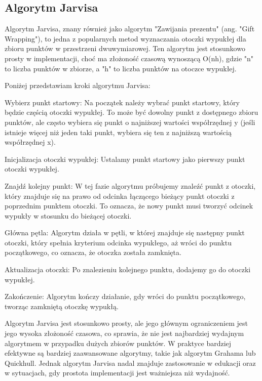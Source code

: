 \subsection{Algorytm Jarvisa}
Algorytm Jarvisa, znany również jako algorytm "Zawijania prezentu" (ang. "Gift Wrapping"), to jedna z popularnych metod wyznaczania otoczki wypukłej dla zbioru punktów w przestrzeni dwuwymiarowej. Ten algorytm jest stosunkowo prosty w implementacji, choć ma złożoność czasową wynoszącą O(nh), gdzie "n" to liczba punktów w zbiorze, a "h" to liczba punktów na otoczce wypukłej.

Poniżej przedstawiam kroki algorytmu Jarvisa:

Wybierz punkt startowy: Na początek należy wybrać punkt startowy, który będzie częścią otoczki wypukłej. To może być dowolny punkt z dostępnego zbioru punktów, ale często wybiera się punkt o najniższej wartości współrzędnej y (jeśli istnieje więcej niż jeden taki punkt, wybiera się ten z najniższą wartością współrzędnej x).

Inicjalizacja otoczki wypukłej: Ustalamy punkt startowy jako pierwszy punkt otoczki wypukłej.

Znajdź kolejny punkt: W tej fazie algorytmu próbujemy znaleźć punkt z otoczki, który znajduje się na prawo od odcinka łączącego bieżący punkt otoczki z poprzednim punktem otoczki. To oznacza, że nowy punkt musi tworzyć odcinek wypukły w stosunku do bieżącej otoczki.

Główna pętla: Algorytm działa w pętli, w której znajduje się następny punkt otoczki, który spełnia kryterium odcinka wypukłego, aż wróci do punktu początkowego, co oznacza, że otoczka została zamknięta.

Aktualizacja otoczki: Po znalezieniu kolejnego punktu, dodajemy go do otoczki wypukłej.

Zakończenie: Algorytm kończy działanie, gdy wróci do punktu początkowego, tworząc zamkniętą otoczkę wypukłą.

Algorytm Jarvisa jest stosunkowo prosty, ale jego głównym ograniczeniem jest jego wysoka złożoność czasowa, co sprawia, że nie jest najbardziej wydajnym algorytmem w przypadku dużych zbiorów punktów. W praktyce bardziej efektywne są bardziej zaawansowane algorytmy, takie jak algorytm Grahama lub Quickhull. Jednak algorytm Jarvisa nadal znajduje zastosowanie w edukacji oraz w sytuacjach, gdy prostota implementacji jest ważniejsza niż wydajność.




